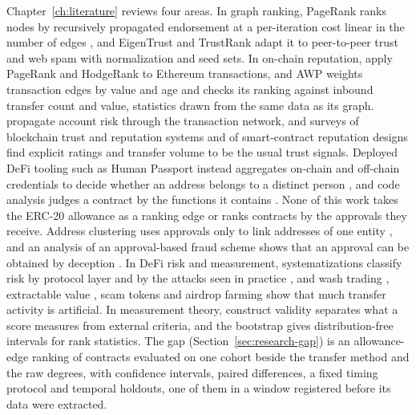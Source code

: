 Chapter~\ref{ch:literature} reviews four areas. In graph ranking, PageRank \parencite{page1999pagerank} ranks nodes by recursively propagated endorsement at a per-iteration cost linear in the number of edges \parencite{langville2006pagerank}, and EigenTrust \parencite{kamvar2003eigentrust} and TrustRank \parencite{gyongyi2004trustrank} adapt it to peer-to-peer trust and web spam with normalization and seed sets. In on-chain reputation, \textcite{do2023hodgerank} apply PageRank and HodgeRank to Ethereum transactions, and AWP \parencite{do2023awp} weights transaction edges by value and age and checks its ranking against inbound transfer count and value, statistics drawn from the same data as its graph. \textcite{lin2025riskprop} propagate account risk through the transaction network, and surveys of blockchain trust and reputation systems \parencite{bellini2020trust} and of smart-contract reputation designs \parencite{almasoud2020reputation} find explicit ratings and transfer volume to be the usual trust signals. Deployed DeFi tooling such as Human Passport instead aggregates on-chain and off-chain credentials to decide whether an address belongs to a distinct person \parencite{humanpassportnddocs}, and code analysis judges a contract by the functions it contains \parencite{lin2024crpwarner}. None of this work takes the ERC-20 allowance \parencite{vogelsteller2015erc20} as a ranking edge or ranks contracts by the approvals they receive. Address clustering uses approvals only to link addresses of one entity \parencite{victor2020clustering}, and an analysis of an approval-based fraud scheme shows that an approval can be obtained by deception \parencite{adamczyk2025approval}. In DeFi risk and measurement, systematizations classify risk by protocol layer \parencite{werner2022sok} and by the attacks seen in practice \parencite{zhou2023sok}, and wash trading \parencite{victor2021washtrading}, extractable value \parencite{qin2022bev}, scam tokens \parencite{xia2021scamtokens} and airdrop farming \parencite{luo2025airdrop} show that much transfer activity is artificial. In measurement theory, construct validity \parencite{cronbach1955construct} separates what a score measures from external criteria, and the bootstrap \parencite{efron1979bootstrap} gives distribution-free intervals for rank statistics. The gap (Section~\ref{sec:research-gap}) is an allowance-edge ranking of contracts evaluated on one cohort beside the transfer method and the raw degrees, with confidence intervals, paired differences, a fixed timing protocol and temporal holdouts, one of them in a window registered before its data were extracted.

